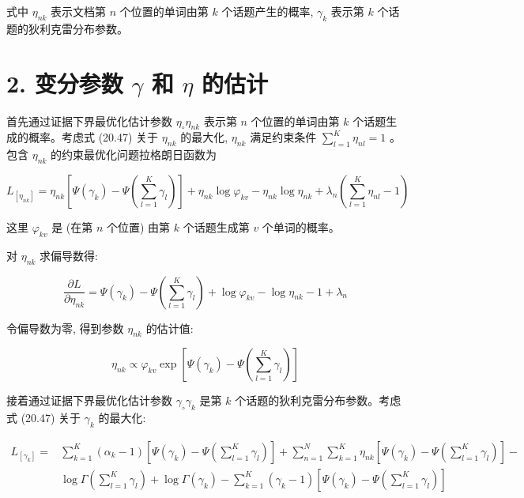 \documentclass[10pt]{article}
\begin{document}
\begin{CJK*}{UTF8}{bsmi}
式中 $\eta_{n k}$ 表示文档第 $n$ 个位置的单词由第 $k$ 个话题产生的概率, $\gamma_{k}$ 表示第 $k$ 个话题的狄利克雷分布参数。

\section*{2. 变分参数 $\gamma$ 和 $\eta$ 的估计}
首先通过证据下界最优化估计参数 $\eta_{\circ} \eta_{n k}$ 表示第 $n$ 个位置的单词由第 $k$ 个话题生成的概率。考虑式 (20.47) 关于 $\eta_{n k}$ 的最大化, $\eta_{n k}$ 满足约束条件 $\sum_{l=1}^{K} \eta_{n l}=1$ 。包含 $\eta_{n k}$ 的约束最优化问题拉格朗日函数为


\begin{equation*}
L_{\left[\eta_{n k}\right]}=\eta_{n k}\left[\Psi\left(\gamma_{k}\right)-\Psi\left(\sum_{l=1}^{K} \gamma_{l}\right)\right]+\eta_{n k} \log \varphi_{k v}-\eta_{n k} \log \eta_{n k}+\lambda_{n}\left(\sum_{l=1}^{K} \eta_{n l}-1\right) \tag{20.56}
\end{equation*}


这里 $\varphi_{k v}$ 是 (在第 $n$ 个位置) 由第 $k$ 个话题生成第 $v$ 个单词的概率。

对 $\eta_{n k}$ 求偏导数得:


\begin{equation*}
\frac{\partial L}{\partial \eta_{n k}}=\Psi\left(\gamma_{k}\right)-\Psi\left(\sum_{l=1}^{K} \gamma_{l}\right)+\log \varphi_{k v}-\log \eta_{n k}-1+\lambda_{n} \tag{20.57}
\end{equation*}


令偏导数为零, 得到参数 $\eta_{n k}$ 的估计值:


\begin{equation*}
\eta_{n k} \propto \varphi_{k v} \exp \left[\Psi\left(\gamma_{k}\right)-\Psi\left(\sum_{l=1}^{K} \gamma_{l}\right)\right] \tag{20.58}
\end{equation*}


接着通过证据下界最优化估计参数 $\gamma_{\circ} \gamma_{k}$ 是第 $k$ 个话题的狄利克雷分布参数。考虑式 (20.47) 关于 $\gamma_{k}$ 的最大化:


\begin{align*}
L_{\left[\gamma_{k}\right]}= & \sum_{k=1}^{K}\left(\alpha_{k}-1\right)\left[\Psi\left(\gamma_{k}\right)-\Psi\left(\sum_{l=1}^{K} \gamma_{l}\right)\right]+\sum_{n=1}^{N} \sum_{k=1}^{K} \eta_{n k}\left[\Psi\left(\gamma_{k}\right)-\Psi\left(\sum_{l=1}^{K} \gamma_{l}\right)\right]- \\
& \log \Gamma\left(\sum_{l=1}^{K} \gamma_{l}\right)+\log \Gamma\left(\gamma_{k}\right)-\sum_{k=1}^{K}\left(\gamma_{k}-1\right)\left[\Psi\left(\gamma_{k}\right)-\Psi\left(\sum_{l=1}^{K} \gamma_{l}\right)\right] \tag{20.59}
\end{align*}



\end{CJK*}
\end{document}
